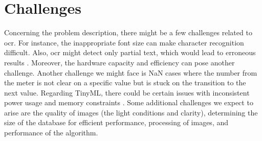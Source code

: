 \section{Challenges}

Concerning the problem description, there might be a few challenges related to \ac{ocr}. For instance, the inappropriate font size can make character recognition difficult. Also,  \ac{ocr}  might detect only partial text, which would lead to erroneous results \cite{Martin:2021}. Moreover, the hardware capacity and efficiency can pose another challenge. Another challenge we might face is NaN cases where the number from the meter is not clear on a specific value but is stuck on the transition to the next value. Regarding TinyML, there could be certain issues with inconsistent power usage and memory constraints \cite{Sagar:2020}. Some additional challenges we expect to arise are the quality of images (the light conditions and clarity), determining the size of the database for efficient performance, processing of images, and performance of the algorithm.